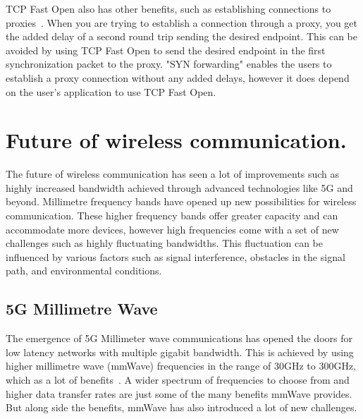 \documentclass[a4paper,english, 11pt]{report}
\begin{document}
TCP Fast Open also has other benefits, such as establishing connections to proxies~\cite{rfc8803}. When you are trying to establish a connection through a proxy, you get the added delay of a second round trip sending the desired endpoint. This can be avoided by using TCP Fast Open to send the desired endpoint in the first synchronization packet to the proxy. "SYN forwarding" enables the users to establish a proxy connection without any added delays, however it does depend on the user's application to use TCP Fast Open.

\section{Future of wireless communication.}
The future of wireless communication has seen a lot of improvements such as highly increased bandwidth achieved through advanced technologies like 5G and beyond. Millimetre frequency bands have opened up new possibilities for wireless communication. These higher frequency bands offer greater capacity and can accommodate more devices, however high frequencies come with a set of new challenges such as highly fluctuating bandwidths. This fluctuation can be influenced by various factors such as signal interference, obstacles in the signal path, and environmental conditions.

\subsection{5G Millimetre Wave}
The emergence of 5G Millimeter wave communications has opened the doors for low latency networks with multiple gigabit bandwidth. This is achieved by using higher millimetre wave (mmWave) frequencies in the range of 30GHz to 300GHz, which as a lot of benefits~\cite{Agrawal_Sharma_2016}. A wider spectrum of frequencies to choose from and higher data transfer rates are just some of the many benefits mmWave provides. But along side the benefits, mmWave has also introduced a lot of new challenges.\\
\end{document}

